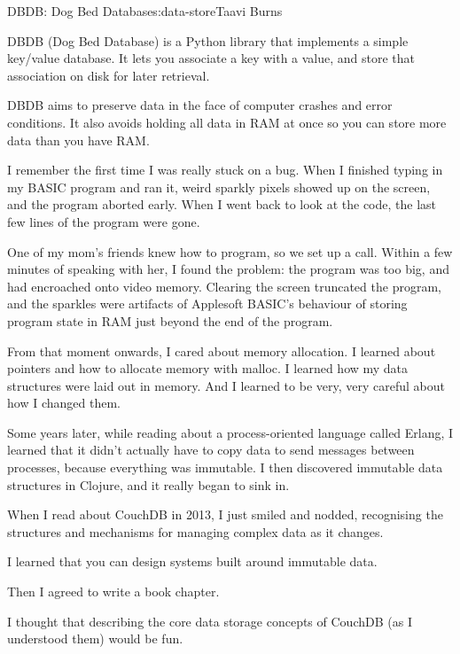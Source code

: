 \begin{aosachapter}{DBDB: Dog Bed Database}{s:data-store}{Taavi Burns}

\label{introduction}

DBDB (Dog Bed Database) is a Python library that implements a simple
key/value database. It lets you associate a key with a value, and store
that association on disk for later retrieval.

DBDB aims to preserve data in the face of computer crashes and error
conditions. It also avoids holding all data in RAM at once so you can
store more data than you have RAM.

\label{memory}

I remember the first time I was really stuck on a bug. When I finished
typing in my BASIC program and ran it, weird sparkly pixels showed up on
the screen, and the program aborted early. When I went back to look at
the code, the last few lines of the program were gone.

One of my mom's friends knew how to program, so we set up a call. Within
a few minutes of speaking with her, I found the problem: the program was
too big, and had encroached onto video memory. Clearing the screen
truncated the program, and the sparkles were artifacts of Applesoft
BASIC's behaviour of storing program state in RAM just beyond the end of
the program.

From that moment onwards, I cared about memory allocation. I learned
about pointers and how to allocate memory with malloc. I learned how my
data structures were laid out in memory. And I learned to be very, very
careful about how I changed them.

Some years later, while reading about a process-oriented language called
Erlang, I learned that it didn't actually have to copy data to send
messages between processes, because everything was immutable. I then
discovered immutable data structures in Clojure, and it really began to
sink in.

When I read about CouchDB in 2013, I just smiled and nodded, recognising
the structures and mechanisms for managing complex data as it changes.

I learned that you can design systems built around immutable data.

Then I agreed to write a book chapter.

I thought that describing the core data storage concepts of CouchDB (as
I understood them) would be fun.


\end{aosachapter}
